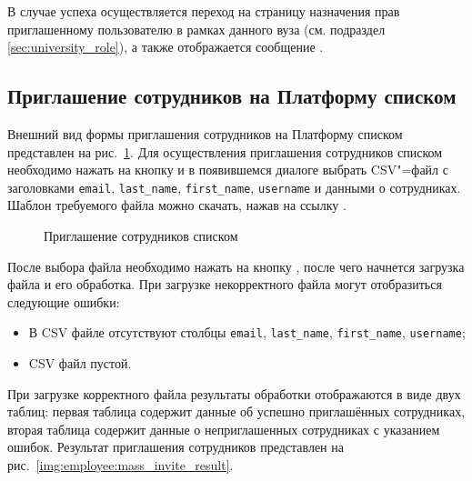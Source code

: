 В случае успеха осуществляется переход на страницу назначения прав приглашенному пользователю в рамках данного вуза 
(см. подраздел \ref{sec:university_role}), а также отображается сообщение .

\subsection{Приглашение сотрудников на Платформу списком}
Внешний вид формы приглашения сотрудников на Платформу списком представлен на рис.~\ref{img:employee:mass_invite}. 
Для осуществления приглашения сотрудников списком необходимо нажать на кнопку  и в появившемся диалоге выбрать CSV"=файл 
с заголовками {\tt email}, {\tt last\_name}, {\tt first\_name}, {\tt username} и данными о сотрудниках. 
Шаблон требуемого файла можно скачать, нажав на ссылку .

\begin{figure}[H]
	\caption{Приглашение сотрудников списком}
	\label{img:employee:mass_invite}
\end{figure}

После выбора файла необходимо нажать на кнопку , после чего начнется загрузка файла и его обработка.
При загрузке некорректного файла могут отобразиться следующие ошибки:
\begin{itemize}
	\item В CSV файле отсутствуют столбцы {\tt email}, {\tt last\_name}, {\tt first\_name}, {\tt username};
	\item CSV файл пустой.
\end{itemize} 

При загрузке корректного файла результаты обработки отображаются в виде двух таблиц: 
первая таблица содержит данные об успешно приглашённых сотрудниках, 
вторая таблица содержит данные о неприглашенных сотрудниках с указанием ошибок. 
Результат приглашения сотрудников представлен на рис.~\ref{img:employee:mass_invite_result}.

